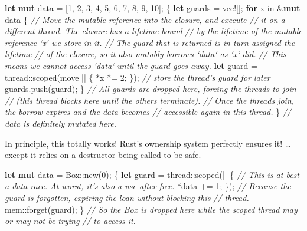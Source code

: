 \documentclass[a4paper,]{book}
\newenvironment{Shaded}{\begin{snugshade}}{\end{snugshade}}
\newcommand{\KeywordTok}[1]{\textcolor[rgb]{0.13,0.29,0.53}{\textbf{{#1}}}}
\newcommand{\DecValTok}[1]{\textcolor[rgb]{0.00,0.00,0.81}{{#1}}}
\newcommand{\CommentTok}[1]{\textcolor[rgb]{0.56,0.35,0.01}{\textit{{#1}}}}
\newcommand{\OtherTok}[1]{\textcolor[rgb]{0.56,0.35,0.01}{{#1}}}
\newcommand{\NormalTok}[1]{{#1}}
\begin{document}
\begin{Shaded}
\begin{Highlighting}[]
\KeywordTok{let} \KeywordTok{mut} \NormalTok{data = [}\DecValTok{1}\NormalTok{, }\DecValTok{2}\NormalTok{, }\DecValTok{3}\NormalTok{, }\DecValTok{4}\NormalTok{, }\DecValTok{5}\NormalTok{, }\DecValTok{6}\NormalTok{, }\DecValTok{7}\NormalTok{, }\DecValTok{8}\NormalTok{, }\DecValTok{9}\NormalTok{, }\DecValTok{10}\NormalTok{];}
\NormalTok{\{}
    \KeywordTok{let} \NormalTok{guards = }\OtherTok{vec!}\NormalTok{[];}
    \KeywordTok{for} \NormalTok{x in &}\KeywordTok{mut} \NormalTok{data \{}
        \CommentTok{// Move the mutable reference into the closure, and execute}
        \CommentTok{// it on a different thread. The closure has a lifetime bound}
        \CommentTok{// by the lifetime of the mutable reference `x` we store in it.}
        \CommentTok{// The guard that is returned is in turn assigned the lifetime}
        \CommentTok{// of the closure, so it also mutably borrows `data` as `x` did.}
        \CommentTok{// This means we cannot access `data` until the guard goes away.}
        \KeywordTok{let} \NormalTok{guard = thread::scoped(move || \{}
            \NormalTok{*x *= }\DecValTok{2}\NormalTok{;}
        \NormalTok{\});}
        \CommentTok{// store the thread's guard for later}
        \NormalTok{guards.push(guard);}
    \NormalTok{\}}
    \CommentTok{// All guards are dropped here, forcing the threads to join}
    \CommentTok{// (this thread blocks here until the others terminate).}
    \CommentTok{// Once the threads join, the borrow expires and the data becomes}
    \CommentTok{// accessible again in this thread.}
\NormalTok{\}}
\CommentTok{// data is definitely mutated here.}
\end{Highlighting}
\end{Shaded}

In principle, this totally works! Rust's ownership system perfectly
ensures it! \ldots{}except it relies on a destructor being called to be
safe.

\begin{Shaded}
\begin{Highlighting}[]
\KeywordTok{let} \KeywordTok{mut} \NormalTok{data = Box::new(}\DecValTok{0}\NormalTok{);}
\NormalTok{\{}
    \KeywordTok{let} \NormalTok{guard = thread::scoped(|| \{}
        \CommentTok{// This is at best a data race. At worst, it's also a use-after-free.}
        \NormalTok{*data += }\DecValTok{1}\NormalTok{;}
    \NormalTok{\});}
    \CommentTok{// Because the guard is forgotten, expiring the loan without blocking this}
    \CommentTok{// thread.}
    \NormalTok{mem::forget(guard);}
\NormalTok{\}}
\CommentTok{// So the Box is dropped here while the scoped thread may or may not be trying}
\CommentTok{// to access it.}
\end{Highlighting}
\end{Shaded}
\end{document}
